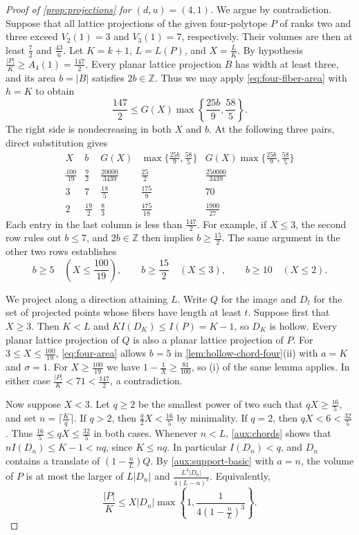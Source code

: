 \documentclass[reqno, 11pt]{article}
\numberwithin{equation}{section}
\theoremstyle{definition}
\newcommand{\Z}{\mathbb Z}
\begin{document}
\begin{proof}[Proof of \cref{prop:projections} for $(d,u)=(4,1)$]
We argue by contradiction. Suppose that all lattice projections of the
given four-polytope $P$ of ranks two and three exceed $V_2(1)=3$ and
$V_3(1)=7$, respectively. Their volumes are then at least
$\frac{7}{2}$ and $\frac{43}{6}$. Let $K=k+1$, $L=L(P)$, and
$X=\frac{L}{K}$. By hypothesis $\frac{|P|}{K}\ge A_4(1)=\frac{147}{2}$.
Every planar lattice projection $B$ has width at least three, and
its area $b=|B|$ satisfies $2b\in\Z$. Thus we may apply
\eqref{eq:four-fiber-area} with $h=K$ to obtain
\[
       \frac{147}{2}\le G(X)\max\left\{\frac{25b}{9},\frac{58}{5}\right\}.
\]
The right side is nondecreasing in both $X$ and $b$. At the following
three pairs, direct substitution gives
\[
\renewcommand{\arraystretch}{1.3}
\begin{array}{cc|ccc}
 X&b&G(X)&\max\{\frac{25b}{9},\frac{58}{5}\}&
                G(X)\max\{\frac{25b}{9},\frac{58}{5}\}\\ \hline
 \frac{100}{19}&\frac{9}{2}&\frac{20000}{3439}&
              \frac{25}{2}&\frac{250000}{3439}\\
 3&7&\frac{18}{5}&\frac{175}{9}&70\\
 2&\frac{19}{2}&\frac{8}{3}&\frac{475}{18}&\frac{1900}{27}
\end{array}
\]
Each entry in the last column is less than $\frac{147}{2}$. For example,
if $X\le3$, the second row rules out $b\le7$, and $2b\in\Z$
then implies $b\ge\frac{15}{2}$. The same argument in the other two
rows establishes
\begin{equation}\label{eq:four-area}
 b\ge5\quad (X\le\frac{100}{19}),\qquad
 b\ge\frac{15}{2}\quad (X\le3),\qquad b\ge10\quad (X\le2).
\end{equation}

We project along a direction attaining $L$. Write $Q$ for the image
and $D_t$ for the set of projected points whose fibers have length
at least $t$. Suppose first that $X\ge3$. Then $K<L$ and
$K I(D_K)\le I(P)=K-1$, so $D_K$ is hollow. Every planar lattice
projection of $Q$ is also a planar lattice projection of $P$.
For $3\le X\le\frac{100}{19}$, \eqref{eq:four-area} allows
$b=5$ in \cref{lem:hollow-chord-four}(ii) with $a=K$ and $\sigma=1$.
For $X\ge\frac{100}{19}$ we have $1-\frac{1}{X}\ge\frac{81}{100}$,
so (i) of the same lemma applies. In either case
$\frac{|P|}{K}<71<\frac{147}{2}$, a contradiction.

Now suppose $X<3$. Let $q\ge2$ be the smallest power of two such that
$qX\ge\frac{16}{5}$, and set $n=\lceil\frac{K}{q}\rceil$. If $q>2$,
then $\frac{q}{2}X<\frac{16}{5}$ by minimality. If $q=2$, then
$qX<6<\frac{32}{5}$. Thus
$\frac{16}{5}\le qX\le\frac{32}{5}$ in both cases. Whenever $n<L$,
\cref{aux:chords} shows that $nI(D_n)\le K-1<nq$, since $K\le nq$.
In particular $I(D_n)<q$, and $D_n$ contains a translate of
$(1-\frac{n}{L})Q$. By \eqref{aux:support-basic} with $a=n$, the
volume of $P$ is at most the larger of $L|D_n|$ and
$\frac{L^4|D_n|}{4(L-n)^3}$. Equivalently,
\begin{equation}\label{eq:four-chord-volume}
 \frac{|P|}{K}\le X|D_n|
   \max\left\{1,\frac{1}{4(1-\frac{n}{L})^3}\right\}.
\end{equation}


\end{proof}
\end{document}

